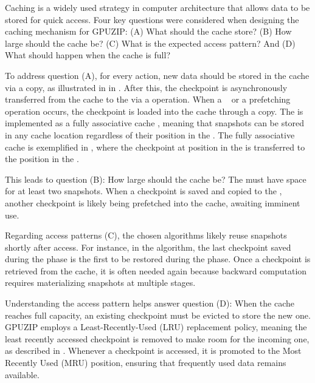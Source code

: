\documentclass[Ingles]{ic-tese-v3}
\begin{document}
Caching is a widely used strategy in computer architecture that allows data to be stored for quick access. Four key questions were considered when designing the caching mechanism for GPUZIP: (A) What should the cache store? (B) How large should the cache be? (C) What is the expected access pattern? And (D) What should happen when the cache is full?

To address question (A), for every \save action, new data should be stored in the cache via a \dtd copy, as illustrated in  in . After this, the checkpoint is asynchronously transferred from the cache to the \pool via a \dth operation. When a \restore~ or a prefetching
 operation occurs, the checkpoint is loaded into the cache through a \htd copy. The \cache is implemented as a fully associative cache \cite{patterson1995}, meaning that snapshots can be stored in any cache location regardless of their position in the \pool. The fully associative cache is exemplified in , where the checkpoint at position  in the \pool is transferred to the position  in the \cache.

This leads to question (B): How large should the cache be? The \cache must have space for at least two snapshots. When a checkpoint is saved and copied to the \pool, another checkpoint is likely being prefetched into the cache, awaiting imminent use. %

Regarding access patterns (C), the chosen \checkpointing algorithms likely reuse snapshots shortly after access. For instance, in the \revolve algorithm, the last checkpoint saved during the \fwd phase is the first to be restored during the \bwd phase. Once a checkpoint is retrieved from the cache, it is often needed again because backward computation requires materializing snapshots at multiple stages.

Understanding the access pattern helps answer question (D): When the cache reaches full capacity, an existing checkpoint must be evicted to store the new one. GPUZIP employs a Least-Recently-Used (LRU) replacement policy, meaning the least recently accessed checkpoint is removed to make room for the incoming one, as described in \cite{butt2007}. Whenever a checkpoint is accessed, it is promoted to the Most Recently Used (MRU) position, ensuring that frequently used data remains available.
\end{document}
